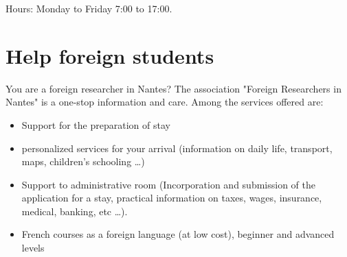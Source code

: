 Hours: Monday to Friday 7:00 to 17:00.


\section{Help foreign students}
You are a foreign researcher in Nantes?
The association "Foreign Researchers in Nantes" is a one-stop information and care.
Among the services offered are:
\begin{itemize}
   \item Support for the preparation of stay
   \item personalized services for your arrival (information on daily life, transport, maps, children's schooling \dots)
   \item Support to administrative room (Incorporation and submission of the application for a stay, practical information on taxes, wages, insurance, medical, banking, etc \dots).
   \item French courses as a foreign language (at low cost), beginner and advanced levels
\end{itemize}

